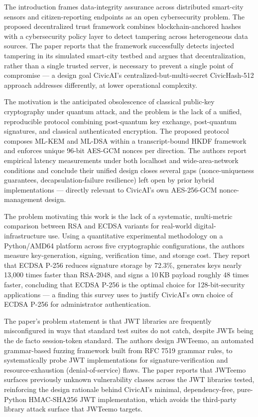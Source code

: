 \documentclass[conference]{IEEEtran}
\begin{document}
\cite{l17decentralizedtrust} The introduction frames data-integrity assurance across distributed smart-city sensors and citizen-reporting endpoints as an open cybersecurity problem. The proposed decentralized trust framework combines blockchain-anchored hashes with a cybersecurity policy layer to detect tampering across heterogeneous data sources. The paper reports that the framework successfully detects injected tampering in its simulated smart-city testbed and argues that decentralization, rather than a single trusted server, is necessary to prevent a single point of compromise --- a design goal CivicAI's centralized-but-multi-secret CivicHash-512 approach addresses differently, at lower operational complexity.

\cite{l18pqcsession} The motivation is the anticipated obsolescence of classical public-key cryptography under quantum attack, and the problem is the lack of a unified, reproducible protocol combining post-quantum key exchange, post-quantum signatures, and classical authenticated encryption. The proposed protocol composes ML-KEM and ML-DSA within a transcript-bound HKDF framework and enforces unique 96-bit AES-GCM nonces per direction. The authors report empirical latency measurements under both localhost and wide-area-network conditions and conclude their unified design closes several gaps (nonce-uniqueness guarantees, decapsulation-failure resilience) left open by prior hybrid implementations --- directly relevant to CivicAI's own AES-256-GCM nonce-management design.

\cite{l19ecdsabenchmark} The problem motivating this work is the lack of a systematic, multi-metric comparison between RSA and ECDSA variants for real-world digital-infrastructure use. Using a quantitative experimental methodology on a Python/AMD64 platform across five cryptographic configurations, the authors measure key-generation, signing, verification time, and storage cost. They report that ECDSA P-256 reduces signature storage by 72.3\%, generates keys nearly 13{,}000 times faster than RSA-2048, and signs a 10\,KB payload roughly 48 times faster, concluding that ECDSA P-256 is the optimal choice for 128-bit-security applications --- a finding this survey uses to justify CivicAI's own choice of ECDSA P-256 for administrator authentication.

\cite{l20jwteemo} The paper's problem statement is that JWT libraries are frequently misconfigured in ways that standard test suites do not catch, despite JWTs being the de facto session-token standard. The authors design JWTeemo, an automated grammar-based fuzzing framework built from RFC 7519 grammar rules, to systematically probe JWT implementations for signature-verification and resource-exhaustion (denial-of-service) flaws. The paper reports that JWTeemo surfaces previously unknown vulnerability classes across the JWT libraries tested, reinforcing the design rationale behind CivicAI's minimal, dependency-free, pure-Python HMAC-SHA256 JWT implementation, which avoids the third-party library attack surface that JWTeemo targets.
\end{document}
